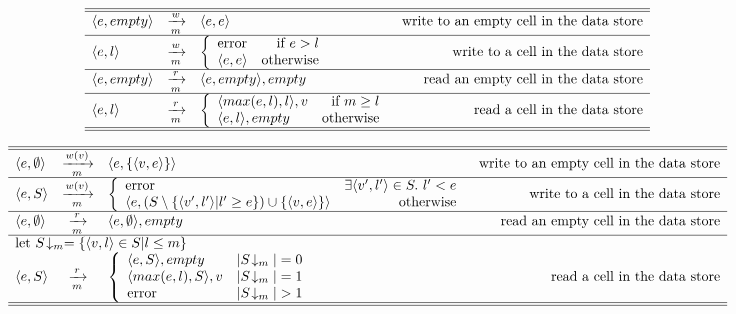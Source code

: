 

\begin{table}
\[
\begin{array}{lclr}
\hline\hline
\langle e,empty \rangle & \xrightarrow[m]{w} & \langle e,e \rangle & \mbox{write to an empty cell in the data store}\\
\hline
\langle e,l \rangle & \xrightarrow[m]{w} & \left \{ \begin{array}{lr} \mbox{error} & \mbox{if} ~ e > l \\ \langle e,e \rangle & \mbox{otherwise} \end{array} \right. & \mbox{write to a cell in the data store}\\
\hline
\langle e,empty \rangle & \xrightarrow[m]{r} & \langle e,empty \rangle, empty & \mbox{read an empty cell in the data store}\\
\hline
\langle e,l \rangle & \xrightarrow[m]{r} & \left \{ \begin{array}{lr} \langle max(e,l),l \rangle, v & \mbox{if} ~ m \geq l \\ \langle e,l \rangle, empty & \mbox{otherwise} \end{array} \right. & \mbox{read a cell in the data store}\\
\hline\hline
\end{array}
\]
\caption{\label{ta:ifc-total}%
Small-step operational semantics for enforcing IFC with a total order over the security labels. $m$ is a paramater of the program execution s.t. m is the maximal security label allowed for the execution.}
\end{table}

\begin{table}
\[
\begin{array}{lclr}
\hline\hline
\semrule{\tuple{e,\emptyset}}{w(v)}{\tuple{e,\{\tuple{v,e}\}}}{\mbox{write to an empty cell in the data store}}\\
\hline
\semrule{\tuple{e,S}}
        {w(v)}
        {\case{\mbox{error}}
              {\exists \tuple{v',l'} \in S. ~ l' < e}
              {\tuple{e,(S \setminus \{\tuple{v',l'} | l' \geq e \}) \cup \{\tuple{v,e}\}}}
              {\mbox{otherwise}}}
        {\mbox{write to a cell in the data store}}\\
\hline
\semrule{\tuple{e,\emptyset}} {r} {\tuple{e,\emptyset}, empty} {\mbox{read an empty cell in the data store}}\\
\hline
\multicolumn{4} {l} {\mbox{let}~ S\!\downarrow_m = \{\tuple{v,l}\in S | l \leq m\} }\\
\semrule{\tuple{e,S}}
        {r}
        {\casethree{\tuple{e,S}, empty} {|S\!\downarrow_m| = 0}
                   {\tuple{max(e,l), S}, v} {|S\!\downarrow_m| = 1}
                   {\mbox{error}}{|S\!\downarrow_m| > 1}}
        {\mbox{read a cell in the data store}}\\
\hline\hline
\end{array}
\]
\caption{\label{ta:ifc-partial}%
Small-step operational semantics for enforcing IFC with a partial order over the security labels. $m$ is a paramater of the program execution s.t. m is the maximal security label allowed for the execution.}
\end{table}

